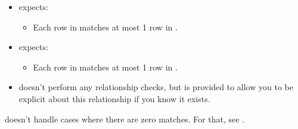 \documentclass[a4paper]{book}
\begin{document}
\begin{Arguments}
\begin{ldescription}
\begin{itemize}
\begin{itemize}
\end{itemize}

\item{}  expects:
\begin{itemize}

\item{} Each row in  matches at most 1 row in .

\end{itemize}

\item{}  expects:
\begin{itemize}

\item{} Each row in  matches at most 1 row in .

\end{itemize}

\item{}  doesn't perform any relationship checks, but is provided
to allow you to be explicit about this relationship if you know it
exists.

\end{itemize}


 doesn't handle cases where there are zero matches. For that,
see .
\end{ldescription}
\end{Arguments}
%
\end{document}
